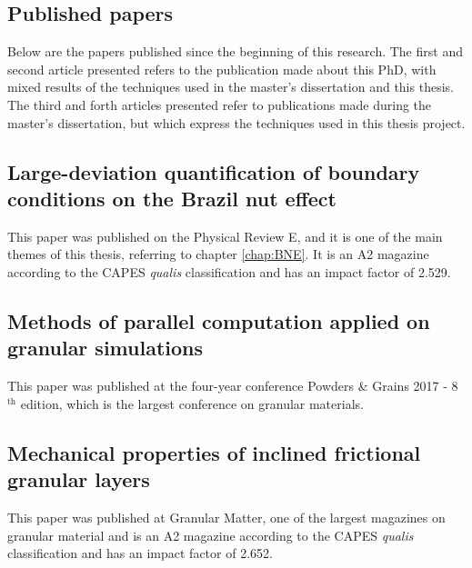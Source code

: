 \begin{apendicesenv}
\partapendices

\chapter{Published papers}
\label{chap:Artigo}
    Below are the papers published since the beginning of this research. The first and second article presented refers to the publication made about this PhD, with mixed results of the techniques used in the master's dissertation \cite{Dissertacao} and this thesis. The third and forth articles presented refer to publications made during the master's dissertation, but which express the techniques used in this thesis project. 

\section{Large-deviation quantification of boundary conditions on the Brazil nut effect}
\label{appendix:BNE}
    This paper was published on the Physical Review E, and it is one of the main themes of this thesis, referring to chapter \ref{chap:BNE}. It is an A2 magazine according to the CAPES \textit{qualis} classification and has an impact factor of 2.529.



\section{Methods of parallel computation applied on granular simulations}
    This paper was published at the four-year conference Powders \& Grains 2017 - 8$^\textrm{th}$ edition, which is the largest conference on granular materials.



\section{Mechanical properties of inclined frictional granular layers}

    This paper was published at Granular Matter, one of the largest magazines on granular material and is an A2 magazine according to the CAPES \textit{qualis} classification and has an impact factor of 2.652.


\end{apendicesenv}
